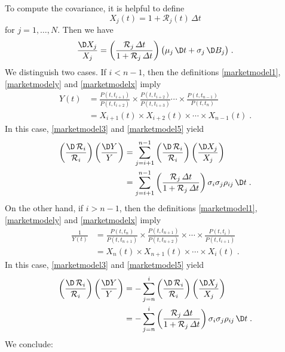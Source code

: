 To compute the covariance, it is helpful to define
\begin{equation}\label{marketmodelx}
X_j(t) = 1+ \mathcal{R}_j(t)\,\varDelta t
\end{equation}
for $j = 1, \ldots , N$.  Then we have
\begin{equation}\label{marketmodel5}
\frac{\D X_j}{X_j} = \left(\frac{\mathcal{R}_j\,\varDelta t}{1+\mathcal{R}_j\,\varDelta t}\right)\big(\mu_j\,\D t + \sigma_j\,\D B_j\big)\;.
\end{equation}
We distinguish two cases.  If $i < n-1$, then the definitions \eqref{marketmodel1}, \eqref{marketmodely} and \eqref{marketmodelx} imply
\begin{align*}
Y(t) &= \frac{P(t,t_{i+1})}{P(t,t_{i+2})} \times \frac{P(t,t_{i+2})}{P(t,t_{i+3})} \cdots \times \frac{P(t,t_{n-1})}{P(t,t_n)}\\
&= X_{i+1}(t)\times X_{i+2}(t) \times \cdots \times X_{n-1}(t)\;.
\end{align*}
In this case, \eqref{marketmodel3} and \eqref{marketmodel5} yield
\begin{align*}
\left( \frac{\D \,\mathcal{R}_i}{\mathcal{R}_i}\right)\left(\frac{\D Y}{Y}\right) &= \sum_{j=i+1}^{n-1} \left( \frac{\D \,\mathcal{R}_i}{\mathcal{R}_i}\right)\left(\frac{\D X_j}{X_j}\right)\\
&= \sum_{j=i+1}^{n-1} \left(\frac{\mathcal{R}_j\,\varDelta t}{1+\mathcal{R}_j\,\varDelta t}\right)\sigma_i\sigma_j\rho_{ij}\,\D t\;.
\end{align*}
On the other hand, if $i > n-1$, then the definitions \eqref{marketmodel1}, \eqref{marketmodely} and \eqref{marketmodelx} imply
\begin{align*}
\frac{1}{Y(t)} &= \frac{P(t,t_{n})}{P(t,t_{n+1})} \times \frac{P(t,t_{n+1})}{P(t,t_{n+2})} \times \cdots \times \frac{P(t,t_{i})}{P(t,t_{i+1})}\\
&= X_{n}(t)\times X_{n+1}(t) \times \cdots \times X_{i}(t)\;.
\end{align*}
In this case, \eqref{marketmodel3} and \eqref{marketmodel5} yield
\begin{align*}
\left( \frac{\D \,\mathcal{R}_i}{\mathcal{R}_i}\right)\left(\frac{\D Y}{Y}\right) &= -\sum_{j=n}^{i} \left( \frac{\D \,\mathcal{R}_i}{\mathcal{R}_i}\right)\left(\frac{\D X_j}{X_j}\right)\\
&= -\sum_{j=n}^{i} \left(\frac{\mathcal{R}_j\,\varDelta t}{1+\mathcal{R}_j\,\varDelta t}\right)\sigma_i\sigma_j\rho_{ij}\,\D t\;.
\end{align*}
We conclude:
